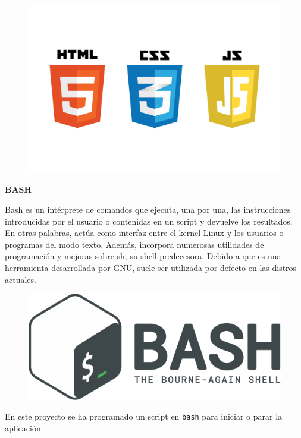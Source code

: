 \begin{figure}[h]
	\centering
	\includegraphics[scale=0.7]{images/9}
\end{figure}

\vspace{-1cm}

\textbf{BASH}

Bash es un intérprete de comandos que ejecuta, una por una, las instrucciones introducidas por el usuario o contenidas en un script y devuelve los resultados. En otras palabras, actúa como interfaz entre el kernel Linux y los usuarios o programas del modo texto. Además, incorpora numerosas utilidades de programación y mejoras sobre sh, su shell predecesora. Debido a que es una herramienta desarrollada por GNU, suele ser utilizada por defecto en las distros actuales.

\begin{figure}[h]
	\centering
	\includegraphics[scale=0.15]{images/10}
\end{figure}

En este proyecto se ha programado un script en \texttt{bash} para iniciar o parar la aplicación.

